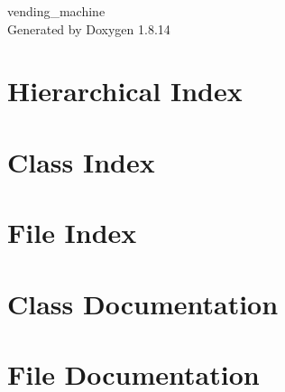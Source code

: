 \documentclass[twoside]{book}
\newcommand{\+}{\discretionary{\mbox{\scriptsize$\hookleftarrow$}}{}{}}
\newcommand{\clearemptydoublepage}{%
  \newpage{\pagestyle{empty}\cleardoublepage}%
}
\begin{document}
\hypersetup{pageanchor=false,
             bookmarksnumbered=true,
             pdfencoding=unicode
            }
\begin{titlepage}
\vspace*{7cm}
\begin{center}%
{\Large vending\+\_\+machine }\\
\vspace*{1cm}
{\large Generated by Doxygen 1.8.14}\\
\end{center}
\end{titlepage}
\clearemptydoublepage
{}
\tableofcontents
\clearemptydoublepage
{}
\hypersetup{pageanchor=true}

\chapter{Hierarchical Index}

\chapter{Class Index}

\chapter{File Index}

\chapter{Class Documentation}












\chapter{File Documentation}






























\backmatter
\newpage
{}
\clearemptydoublepage
{}
\printindex
\end{document}

